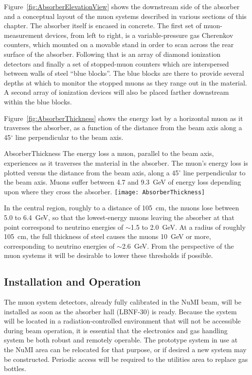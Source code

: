 Figure~\ref{fig:AbsorberElevationView} shows the downstream side of
the absorber and a conceptual layout of the muon systems described in
various sections of this chapter.  The absorber itself is encased in
concrete. The first set of muon-measurement devices, from left to
right, is a variable-pressure gas Cherenkov counters, which mounted on
a movable stand in order to scan across the rear surface of the
absorber.  Following that is an array of diamond ionization detectors
and finally a set of stopped-muon counters which are interspersed
between walls of steel ``blue blocks''.  The blue blocks are there to
provide several depths at which to monitor the stopped muons as they
range out in the material. A second array of ionization devices will
also be placed farther downstream within the blue blocks.


Figure~\ref{fig:AbsorberThickness} shows the energy lost by a
horizontal muon as it traverses the absorber, as a function of the
distance from the beam axis along a 45$^\circ$ line perpendicular to the beam axis. 
\begin{cdrfigure}{AbsorberThickness}
{The energy loss a muon, parallel to the beam axis, experiences as it traverses 
the material in the absorber. The muon's energy loss is plotted versus the distance 
from the beam axis, along a 45$^\circ$ line perpendicular to the beam axis. Muons 
suffer between 4.7 and 9.3~GeV of energy loss depending upon where they cross the absorber.}
\texttt{[image: AbsorberThickness]}
\end{cdrfigure}
In the central region, roughly to a distance of 105~cm, the muons lose
between 5.0 to 6.4~GeV, so that the lowest-energy muons leaving the
absorber at that point correspond to neutrino energies of $\sim$1.5
to 2.0~GeV. At a radius of roughly 105~cm, the full thickness of steel
causes the muons 10~GeV or more, corresponding to neutrino energies of
$\sim$2.6~GeV. From the perspective of the muon systems it will be
desirable to lower these thresholds if possible.


%


\subsection{Installation and Operation}

The muon system detectors, already fully calibrated in the NuMI beam,
will be installed as soon as the absorber hall (LBNF-30) is ready.
Because the system will be located in a radiation-controlled
environment that will not be accessible during beam operation, it is
essential that the electronics and gas handling system be both robust
and remotely operable.  The prototype system in use at the NuMI area
can be relocated for that purpose, or if desired a new system may be
constructed.  Periodic access will be required to the utilities area
to replace gas bottles.

